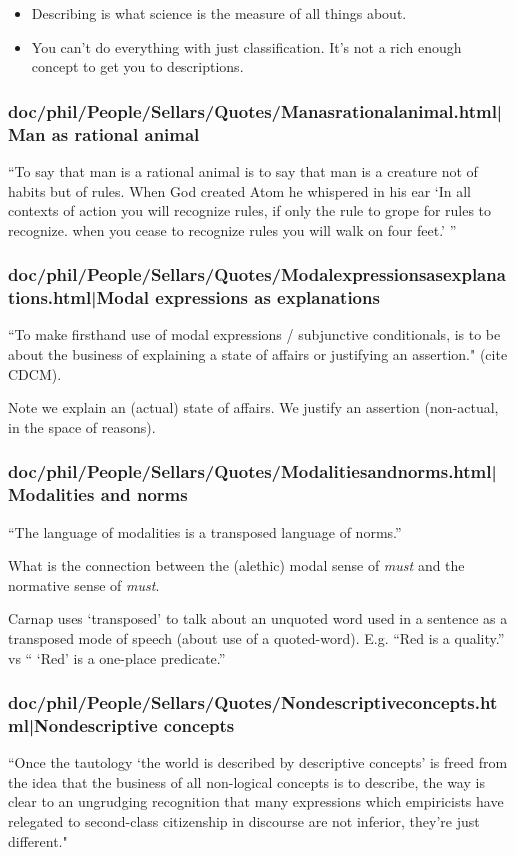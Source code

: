 \documentclass[12pt,a4paper]{report}
\begin{document}
\begin{itemize}
    \item Describing is what science is the measure of all things about.
    \item You can't do everything with just classification. It's not a rich
         enough concept to get you to descriptions.
\end{itemize}
\subsubsection{doc/phil/People/Sellars/Quotes/Manasrationalanimal.html|Man as rational animal}
``To say that man is a rational animal is to say that man is a creature not of
habits but of rules. When God created Atom he whispered in his ear `In all
contexts of action you will recognize rules, if only the rule to grope for rules
to recognize. when you cease to recognize rules you will walk on four feet.' ''

\subsubsection{doc/phil/People/Sellars/Quotes/Modalexpressionsasexplanations.html|Modal expressions as explanations}
``To make firsthand use of modal expressions / subjunctive conditionals, is to
be about the business of explaining a state of affairs or justifying an
assertion." (cite CDCM).

Note we explain an (actual) state of affairs. We justify an assertion
(non-actual, in the space of reasons).

\subsubsection{doc/phil/People/Sellars/Quotes/Modalitiesandnorms.html|Modalities and norms}
``The language of modalities is a transposed language of norms.''


What is the connection between the (alethic) modal sense of \emph{must} and the
 normative sense of \emph{must}.

Carnap uses `transposed' to talk about an unquoted word used in a sentence as a
transposed mode of speech (about use of a quoted-word). E.g. ``Red is a
quality.'' vs `` `Red' is a one-place predicate.''

\subsubsection{doc/phil/People/Sellars/Quotes/Nondescriptiveconcepts.html|Nondescriptive concepts}
``Once the tautology `the world is described by descriptive concepts' is freed
from the idea that the business of all non-logical concepts is to describe, the
 way is clear to an ungrudging recognition that many expressions which
 empiricists have relegated to second-class citizenship in discourse are not
 inferior, they're just different."
\end{document}
